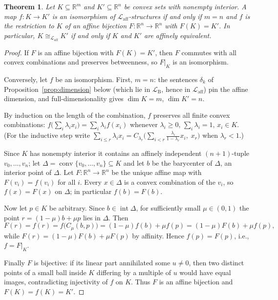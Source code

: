 \documentclass[11pt]{amsart}
\newtheorem{theorem}{Theorem}[section]
\theoremstyle{definition}
\newcommand{\R}{\mathbb{R}}
\newcommand{\Laff}{\mathcal{L}_{\mathrm{aff}}}
\newcommand{\LB}{\mathcal{L}_{\mathrm{B}}}
\newcommand{\conv}{\operatorname{conv}}
\newcommand{\interior}{\operatorname{int}}
\begin{document}
\begin{theorem}\label{thm:iso-affine}
Let $K\subseteq\R^m$ and $K'\subseteq\R^n$ be convex sets with nonempty
interior. A map $f\colon K\to K'$ is an isomorphism of $\Laff$-structures if
and only if $m=n$ and $f$ is the restriction to $K$ of an affine bijection
$F\colon\R^n\to\R^n$ with $F(K)=K'$. In particular, $K\cong_{\Laff}K'$ if and
only if $K$ and $K'$ are affinely equivalent.
\end{theorem}

\begin{proof}
If $F$ is an affine bijection with $F(K)=K'$, then $F$ commutes with all
convex combinations and preserves betweenness, so $F|_K$ is an isomorphism.

Conversely, let $f$ be an isomorphism. First, $m=n$: the sentences
$\delta_k$ of Proposition~\ref{prop:dimension} below (which lie in $\LB$,
hence in $\Laff$) pin the affine dimension, and full-dimensionality gives
$\dim K=m$, $\dim K'=n$.

By induction on the length of the combination, $f$ preserves all finite
convex combinations: $f\bigl(\sum_i\lambda_i x_i\bigr)=\sum_i\lambda_i
f(x_i)$ whenever $\lambda_i\ge 0$, $\sum_i\lambda_i=1$, $x_i\in K$. (For the
inductive step write $\sum_{i\le r}\lambda_i x_i =
C_{\lambda_r}\bigl(\sum_{i<r}\tfrac{\lambda_i}{1-\lambda_r}x_i,\;x_r\bigr)$
when $\lambda_r<1$.)

Since $K$ has nonempty interior it contains an affinely independent
$(n+1)$-tuple $v_0,\dots,v_n$; let $\Delta=\conv\{v_0,\dots,v_n\}\subseteq K$
and let $b$ be the barycenter of $\Delta$, an interior point of $\Delta$. Let
$F\colon\R^n\to\R^n$ be the unique affine map with $F(v_i)=f(v_i)$ for all
$i$. Every $x\in\Delta$ is a convex combination of the $v_i$, so
$f(x)=F(x)$ on $\Delta$; in particular $f(b)=F(b)$.

Now let $p\in K$ be arbitrary. Since $b\in\interior\Delta$, for sufficiently
small $\mu\in(0,1)$ the point $r=(1-\mu)b+\mu p$ lies in $\Delta$. Then
\[
F(r)=f(r)=f\bigl(C_\mu(b,p)\bigr)=(1-\mu)f(b)+\mu f(p)
=(1-\mu)F(b)+\mu f(p),
\]
while $F(r)=(1-\mu)F(b)+\mu F(p)$ by affinity. Hence $f(p)=F(p)$, i.e.,
$f=F|_K$.

Finally $F$ is bijective: if its linear part annihilated some $u\ne 0$, then
two distinct points of a small ball inside $K$ differing by a multiple of $u$
would have equal images, contradicting injectivity of $f$ on $K$. Thus $F$ is
an affine bijection and $F(K)=f(K)=K'$.
\end{proof}
\end{document}
